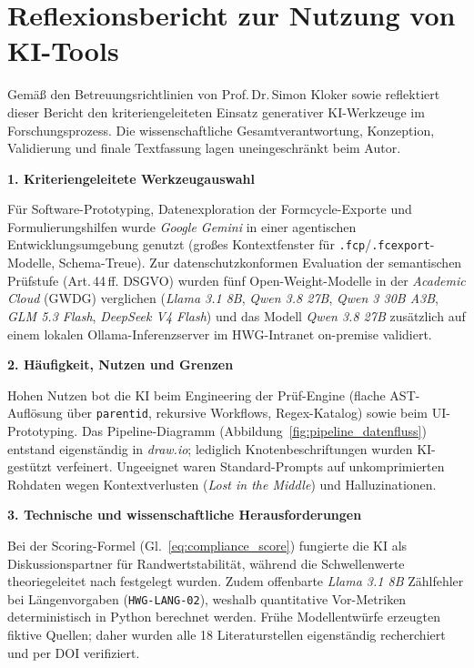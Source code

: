\chapter{Reflexionsbericht zur Nutzung von KI-Tools}
\label{chap:reflexionsbericht}
\enlargethispage{1\baselineskip}

Gemäß den Betreuungsrichtlinien von Prof.\,Dr.\,Simon Kloker sowie \textcite{westermann2026ki} reflektiert dieser Bericht den kriteriengeleiteten Einsatz generativer KI-Werkzeuge im Forschungsprozess. Die wissenschaftliche Gesamtverantwortung, Konzeption, Validierung und finale Textfassung lagen uneingeschränkt beim Autor.

\textbf{1. Kriteriengeleitete Werkzeugauswahl}

Für Software-Prototyping, Datenexploration der Formcycle-Exporte und Formulierungshilfen wurde \textit{Google Gemini} in einer agentischen Entwicklungsumgebung genutzt (großes Kontextfenster für \texttt{.fcp}/\texttt{.fcexport}-Modelle, Schema-Treue). Zur datenschutzkonformen Evaluation der semantischen Prüfstufe (Art.\,44\,ff. DSGVO) wurden fünf Open-Weight-Modelle in der \textit{Academic Cloud} (GWDG) verglichen (\textit{Llama 3.1 8B}, \textit{Qwen 3.8 27B}, \textit{Qwen 3 30B A3B}, \textit{GLM 5.3 Flash}, \textit{DeepSeek V4 Flash}) und das Modell \textit{Qwen 3.8 27B} zusätzlich auf einem lokalen Ollama-Inferenzserver im HWG-Intranet on-premise validiert.

\textbf{2. Häufigkeit, Nutzen und Grenzen}

Hohen Nutzen bot die KI beim Engineering der Prüf-Engine (flache AST-Auflösung über \texttt{parentid}, rekursive Workflows, Regex-Katalog) sowie beim UI-Prototyping. Das Pipeline-Diagramm (Abbildung~\ref{fig:pipeline_datenfluss}) entstand eigenständig in \textit{draw.io}; lediglich Knotenbeschriftungen wurden KI-gestützt verfeinert. Ungeeignet waren Standard-Prompts auf unkomprimierten Rohdaten wegen Kontextverlusten (\textit{Lost in the Middle}) und Halluzinationen.

\textbf{3. Technische und wissenschaftliche Herausforderungen}

Bei der Scoring-Formel (Gl.~\ref{eq:compliance_score}) fungierte die KI als Diskussionspartner für Randwertstabilität, während die Schwellenwerte theoriegeleitet nach \textcite{nielsen1994severity} festgelegt wurden. Zudem offenbarte \textit{Llama 3.1 8B} Zählfehler bei Längenvorgaben (\texttt{HWG-LANG-02}), weshalb quantitative Vor-Metriken deterministisch in Python berechnet werden. Frühe Modellentwürfe erzeugten fiktive Quellen; daher wurden alle 18 Literaturstellen eigenständig recherchiert und per DOI verifiziert.

